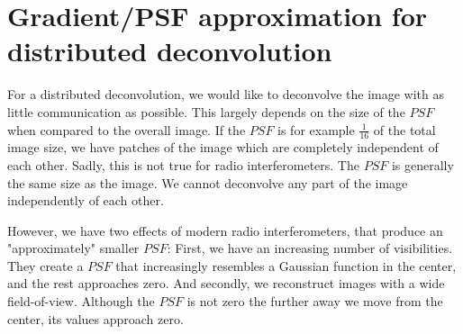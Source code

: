 \section{Gradient/PSF approximation for distributed deconvolution} \label{gradients}
For a distributed deconvolution, we would like to deconvolve the image with as little communication as possible. This largely depends on the size of the $PSF$ when compared to the overall image. If the $PSF$ is for example $\frac{1}{16}$ of the total image size, we have patches of the image which are completely independent of each other. Sadly, this is not true for radio interferometers. The $PSF$ is generally the same size as the image. We cannot deconvolve any part of the image independently of each other.

However, we have two effects of modern radio interferometers, that produce an "approximately" smaller $PSF$: First, we have an increasing number of visibilities. They create a $PSF$ that increasingly resembles a Gaussian function in the center, and the rest approaches zero. And secondly, we reconstruct images with a wide field-of-view. Although the $PSF$ is not zero the further away we move from the center, its values approach zero.

